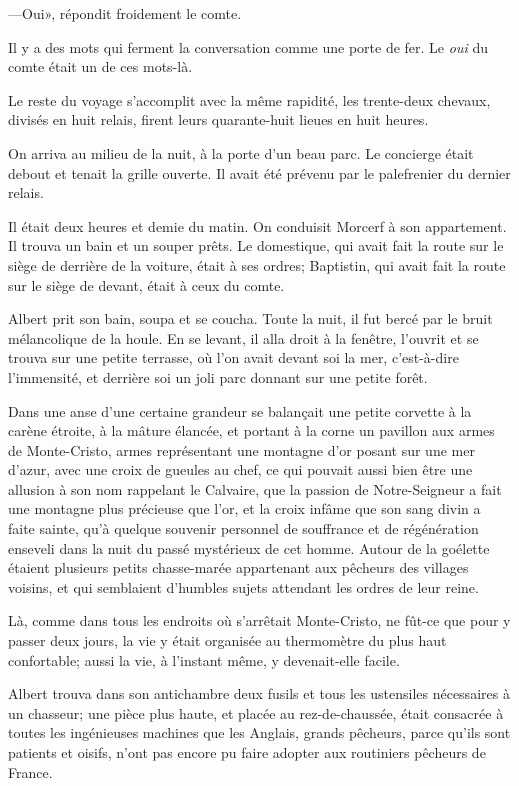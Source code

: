 —Oui», répondit froidement le comte. 

Il y a des mots qui ferment la conversation comme une porte de fer. Le \textit{oui} du comte était un de ces mots-là. 

Le reste du voyage s'accomplit avec la même rapidité, les trente-deux chevaux, divisés en huit relais, firent leurs quarante-huit lieues en huit heures. 

On arriva au milieu de la nuit, à la porte d'un beau parc. Le concierge était debout et tenait la grille ouverte. Il avait été prévenu par le palefrenier du dernier relais. 

Il était deux heures et demie du matin. On conduisit Morcerf à son appartement. Il trouva un bain et un souper prêts. Le domestique, qui avait fait la route sur le siège de derrière de la voiture, était à ses ordres; Baptistin, qui avait fait la route sur le siège de devant, était à ceux du comte. 

Albert prit son bain, soupa et se coucha. Toute la nuit, il fut bercé par le bruit mélancolique de la houle. En se levant, il alla droit à la fenêtre, l'ouvrit et se trouva sur une petite terrasse, où l'on avait devant soi la mer, c'est-à-dire l'immensité, et derrière soi un joli parc donnant sur une petite forêt. 

Dans une anse d'une certaine grandeur se balançait une petite corvette à la carène étroite, à la mâture élancée, et portant à la corne un pavillon aux armes de Monte-Cristo, armes représentant une montagne d'or posant sur une mer d'azur, avec une croix de gueules au chef, ce qui pouvait aussi bien être une allusion à son nom rappelant le Calvaire, que la passion de Notre-Seigneur a fait une montagne plus précieuse que l'or, et la croix infâme que son sang divin a faite sainte, qu'à quelque souvenir personnel de souffrance et de régénération enseveli dans la nuit du passé mystérieux de cet homme. Autour de la goélette étaient plusieurs petits chasse-marée appartenant aux pêcheurs des villages voisins, et qui semblaient d'humbles sujets attendant les ordres de leur reine. 

Là, comme dans tous les endroits où s'arrêtait Monte-Cristo, ne fût-ce que pour y passer deux jours, la vie y était organisée au thermomètre du plus haut confortable; aussi la vie, à l'instant même, y devenait-elle facile. 

Albert trouva dans son antichambre deux fusils et tous les ustensiles nécessaires à un chasseur; une pièce plus haute, et placée au rez-de-chaussée, était consacrée à toutes les ingénieuses machines que les Anglais, grands pêcheurs, parce qu'ils sont patients et oisifs, n'ont pas encore pu faire adopter aux routiniers pêcheurs de France. 

